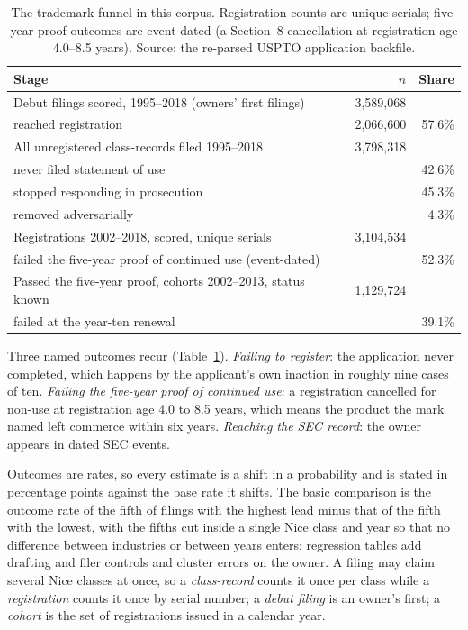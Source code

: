 \begin{table}[!htbp]\centering\small
\caption{The trademark funnel in this corpus. Registration counts are
unique serials; five-year-proof outcomes are event-dated (a Section~8
cancellation at registration age 4.0--8.5 years). Source: the re-parsed
USPTO application backfile.}
\label{tab:funnel}
\begin{tabular}{lrr}
\toprule
Stage & $n$ & Share \\
\midrule
Debut filings scored, 1995--2018 (owners' first filings) & 3{,}589{,}068 & \\
\quad reached registration & 2{,}066{,}600 & 57.6\% \\
\midrule
All unregistered class-records filed 1995--2018 & 3{,}798{,}318 & \\
\quad never filed statement of use & & 42.6\% \\
\quad stopped responding in prosecution & & 45.3\% \\
\quad removed adversarially & & 4.3\% \\
\midrule
Registrations 2002--2018, scored, unique serials & 3{,}104{,}534 & \\
\quad failed the five-year proof of continued use (event-dated) & & 52.3\% \\
\midrule
Passed the five-year proof, cohorts 2002--2013, status known & 1{,}129{,}724 & \\
\quad failed at the year-ten renewal & & 39.1\% \\
\bottomrule
\end{tabular}
\end{table}

Three named outcomes recur (Table~\ref{tab:funnel}). \emph{Failing to
register}: the application never completed, which happens by the
applicant's own inaction in roughly nine cases of ten. \emph{Failing the
five-year proof of continued use}: a registration cancelled for non-use
at registration age 4.0 to 8.5 years, which means the product the mark
named left commerce within six years. \emph{Reaching the SEC record}:
the owner appears in dated SEC events.

Outcomes are rates, so every estimate is a shift in a probability and is
stated in percentage points against the base rate it shifts. The basic
comparison is the outcome rate of the fifth of filings with the highest
lead minus that of the fifth with the lowest, with the fifths cut inside
a single Nice class and year so that no difference between industries or
between years enters; regression tables add drafting and filer controls
and cluster errors on the owner. A filing may claim several Nice classes
at once, so a \emph{class-record} counts it once per class while a
\emph{registration} counts it once by serial number; a \emph{debut
filing} is an owner's first; a \emph{cohort} is the set of registrations
issued in a calendar year.

